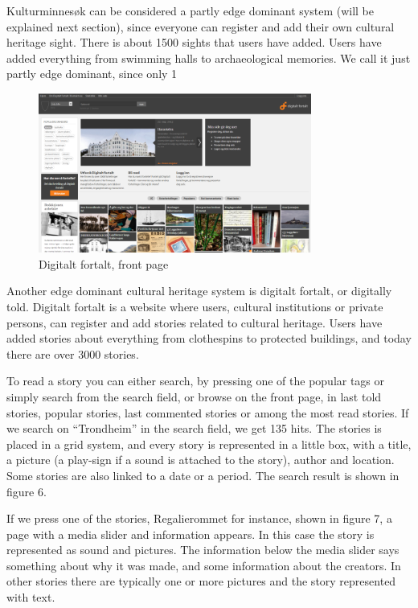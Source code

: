 \documentclass[11pt]{book}
\begin{document}
Kulturminnesøk can be considered a partly edge dominant system (will be explained next section), since everyone can register and add their own cultural heritage sight. There is about 1500 sights that users have added. Users have added everything from swimming halls to archaeological memories. We call it just partly edge dominant, since only 1%

\begin{figure}[H]
      \centering
      \includegraphics[width=0.8\textwidth]{Figures/Prestudy/digitaltfortaltForside.png}
      \caption{Digitalt fortalt, front page}
      \label{fig:pre_fortaltFrontPage}
\end{figure}

Another edge dominant cultural heritage system is digitalt fortalt, or digitally told. Digitalt fortalt is a website where users, cultural institutions or private persons, can register and add stories related to cultural heritage. Users have added stories about everything from clothespins to protected buildings, and today there are over 3000 stories. 

To read a story you can either search, by pressing one of the popular tags or simply search from the search field, or browse on the front page, in last told stories, popular stories, last commented stories or among the most  read stories. If we search on “Trondheim” in the search field, we get 135 hits. The stories is placed in a grid system, and every story is represented in a little box, with a title, a picture (a play-sign if a sound is attached to the story), author and location. Some stories are also linked to a date or a period. The search result is shown in figure 6.

If we press one of the stories, Regalierommet for instance, shown in figure 7, a page with a media slider and information appears. In this case the story is represented as sound and pictures. The information below the media slider says something about why it was made, and some information about the creators. In other stories there are typically one or more pictures and the story represented with text.
\end{document}
